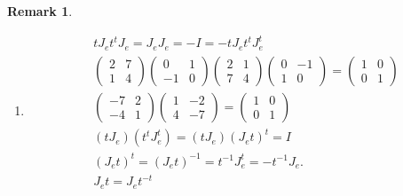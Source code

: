 \documentclass[aps,preprint]{revtex4}
\newtheorem{remark}[theorem]{Remark}
\begin{document}
\begin{remark}
\begin{enumerate}
\item 
\begin{align}
& tJ_{e}t^{t}J_{e}=J_{e}J_{e}=-I=-tJ_{e}t^{t}J_{e}^{t} \\
& \left( 
\begin{array}{cc}
2 & 7 \\ 
1 & 4%
\end{array}%
\right) \left( 
\begin{array}{cc}
0 & 1 \\ 
-1 & 0%
\end{array}%
\right) \left( 
\begin{array}{cc}
2 & 1 \\ 
7 & 4%
\end{array}%
\right) \left( 
\begin{array}{cc}
0 & -1 \\ 
1 & 0%
\end{array}%
\right) =\left( 
\begin{array}{cc}
1 & 0 \\ 
0 & 1%
\end{array}%
\right) \\
& \left( 
\begin{array}{cc}
-7 & 2 \\ 
-4 & 1%
\end{array}%
\right) \left( 
\begin{array}{cc}
1 & -2 \\ 
4 & -7%
\end{array}%
\right) =\left( 
\begin{array}{cc}
1 & 0 \\ 
0 & 1%
\end{array}%
\right) \\
& \left( tJ_{e}\right) \left( t^{t}J_{e}^{t}\right) =\left( tJ_{e}\right)
\left( J_{e}t\right) ^{t}=I \\
& \left( J_{e}t\right) ^{t}=\left( J_{e}t\right)
^{-1}=t^{-1}J_{e}^{t}=-t^{-1}J_{e}. \\
& J_{e}t=J_{e}t^{-t}
\end{align}


\end{enumerate}
\end{remark}
\end{document}
